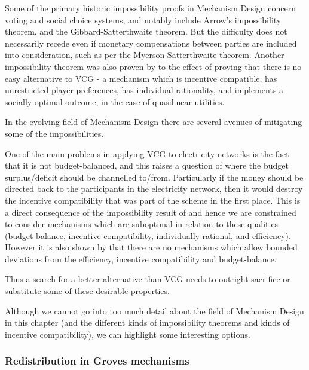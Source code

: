 Some of the primary historic impossibility proofs in Mechanism Design concern voting and social choice systems, and notably include Arrow's impossibility theorem, and the Gibbard-Satterthwaite theorem.
But the difficulty does not necessarily recede even if monetary compensations between parties are included into consideration, such as per the Myerson-Satterthwaite theorem.
Another impossibility theorem was also proven by \cite{29088} to the effect of proving that there is no easy alternative to VCG - a mechanism which is incentive compatible, has unrestricted player preferences, has individual rationality, and implements a socially optimal outcome, in the case of quasilinear utilities.

In the evolving field of Mechanism Design there are several avenues of mitigating some of the impossibilities.


One of the main problems in applying VCG to electricity networks is the fact that it is not budget-balanced, and this raises a question of where the budget surplus/deficit should be channelled to/from.
Particularly if the money should be directed back to the participants in the electricity network, then it would destroy the incentive compatibility that was part of the scheme in the first place.
This is a direct consequence of the impossibility result of \cite{29088} and hence we are constrained to consider mechanisms which are suboptimal in relation to these qualities (budget balance, incentive compatibility, individually rational, and efficiency).
However it is also shown by \cite{YI201679} that there are no mechanisms which allow bounded deviations from the efficiency, incentive compatibility and budget-balance.

Thus a search for a better alternative than VCG needs to outright sacrifice or substitute some of these desirable properties.

Although we cannot go into too much detail about the field of Mechanism Design in this chapter (and the different kinds of impossibility theorems and kinds of incentive compatibility), we can highlight some interesting options.

\subsubsection{Redistribution in Groves mechanisms}\label{subsubsection:groves_mechanisms}

